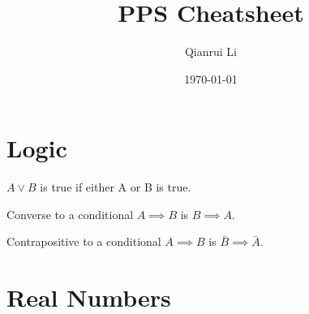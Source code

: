 \documentclass[12pt]{article}
\title{PPS Cheatsheet}
\author{Qianrui Li}
\date{\today}
\begin{document}
\maketitle


\section{Logic}

\begin{definition}[Disjunction]
	$A\lor B$ is true if either A or B is true.
\end{definition}

\begin{definition}[Converse]
	Converse to a conditional $A \implies B$ is $B \implies A$.
\end{definition}

\begin{definition}[Contrapositive]
	Contrapositive to a conditional $A \implies B$ is $\bar{B} \implies \bar{A}$.
\end{definition}

\section{Real Numbers}
\end{document}
